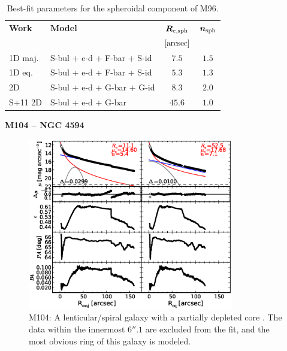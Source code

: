 \documentclass[preprint2]{emulateapj}
\newcommand{\fitfigurewidth}{0.8\textwidth}
\begin{document}
  \begin{table}[h]
  \small
  \caption{Best-fit parameters for the spheroidal component of M96.}
  \begin{center}
  \begin{tabular}{llcc}
  \hline
  {\bf Work} & {\bf Model}   & $\bm R_{\rm e,sph}$    & $\bm n_{\rm sph}$ \\
    &  &  $[\rm arcsec]$ & \\
  \hline
  1D maj. & S-bul + e-d + F-bar + S-id  & $7.5$  &  $1.5$ \\
  1D eq.  & S-bul + e-d + F-bar + S-id  & $5.3$  &  $1.3$ \\
  2D      & S-bul + e-d + G-bar + G-id  & $8.3$  &  $2.0$ \\
  \hline
  S+11 2D         & S-bul + e-d + G-bar  & $45.6$  &  $1.0$ \\
  \hline
  \end{tabular}
  \end{center}
  \label{tab:m96}
  \end{table}


  \clearpage\newpage\noindent

  {\bf M104 -- NGC 4594 \\} 

  \begin{figure}[h]
  \begin{center}
  \includegraphics[width=\fitfigurewidth]{images/m104_1Dfit.eps}
  \caption{M104: 
  A lenticular/spiral galaxy with a partially depleted core \citep{jardel2011}. 
  The data within the innermost $6''.1$ are excluded from the fit, 
  and the most obvious ring of this galaxy is modeled.
  }
  \end{center}
  \end{figure}
  
\end{document}
